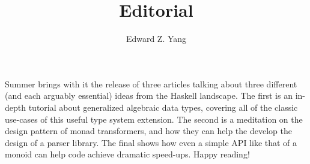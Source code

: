 \documentclass{tmr}
\title{Editorial}
\author{Edward Z. Yang\email{ezyang@cs.stanford.edu}}
\begin{document}
Summer brings with it the release of three articles talking
about three different (and each arguably essential) ideas from
the Haskell landscape.  The first is an in-depth tutorial about
generalized algebraic data types, covering all of the classic
use-cases of this useful type system extension.  The second is
a meditation on the design pattern of monad transformers, and how
they can help the develop the design of a parser library.  The
final shows how even a simple API like that of a monoid can
help code achieve dramatic speed-ups.  Happy reading!
\end{document}
